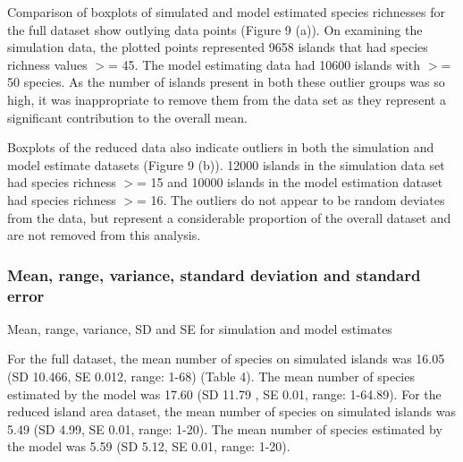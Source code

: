 \documentclass{article}
\begin{document}
\noindent Comparison of boxplots of simulated and model estimated species richnesses for the full dataset show outlying data points (Figure 9 (a)). On examining the simulation data, the plotted points represented 9658 islands that had species richness values $>$= 45. The model estimating data had 10600 islands with $>$= 50 species. As the number of islands present in both these outlier groups was so high, it was inappropriate to remove them from the data set as they represent a significant contribution to the overall mean. \bigskip

\noindent Boxplots of the reduced data also indicate outliers in both the simulation and model estimate datasets (Figure 9 (b)). 12000 islands in the simulation data set had species richness $>$= 15 and 10000 islands in the model estimation dataset had species richness $>$= 16. The outliers do not appear to be random deviates from the data, but represent a considerable proportion of the overall dataset and are not removed from this analysis.  

\subsubsection{Mean, range, variance, standard deviation and standard error}

\begin{table}[h!]
\caption{Mean, range, variance, SD and SE for simulation and model estimates}
\centering
{}
   \end{table}
    
\noindent For the full dataset, the mean number of species on simulated islands was 16.05 (SD 10.466, SE 0.012, range: 1-68) (Table 4).
The mean number of species estimated by the model was 17.60 (SD 11.79 , SE 0.01, range: 1-64.89). For the reduced island area dataset, the mean number of species on simulated islands was 5.49 (SD 4.99, SE 0.01, range: 1-20). The mean number of species estimated by the model was  5.59 (SD 5.12, SE 0.01, range: 1-20).
\end{document}
